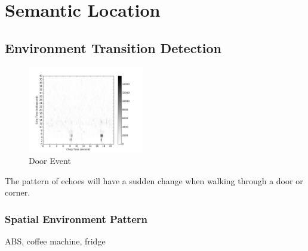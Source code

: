\section{Semantic Location}
\label{sec:sem}



\subsection{Environment Transition Detection}
\begin{figure}[H]
\centering
\includegraphics[width=0.45\textwidth]{./fig/transition.png}
\caption{Door Event}
\end{figure}

The pattern of echoes will have a sudden change when walking through a door or corner.



\subsubsection{Spatial Environment Pattern}

ABS, coffee machine, fridge
